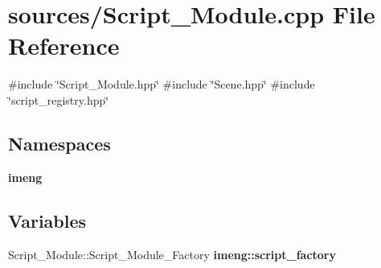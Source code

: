 \section{sources/\+Script\+\_\+\+Module.cpp File Reference}
\label{_script___module_8cpp}
{\ttfamily \#include \char`\"{}Script\+\_\+\+Module.\+hpp\char`\"{}}\newline
{\ttfamily \#include \char`\"{}Scene.\+hpp\char`\"{}}\newline
{\ttfamily \#include \char`\"{}script\+\_\+registry.\+hpp\char`\"{}}\newline
\subsection*{Namespaces}
\begin{DoxyCompactItemize}
\item 
 \textbf{ imeng}
\end{DoxyCompactItemize}
\subsection*{Variables}
\begin{DoxyCompactItemize}
\item 
Script\+\_\+\+Module\+::\+Script\+\_\+\+Module\+\_\+\+Factory \textbf{ imeng\+::script\+\_\+factory}
\end{DoxyCompactItemize}
